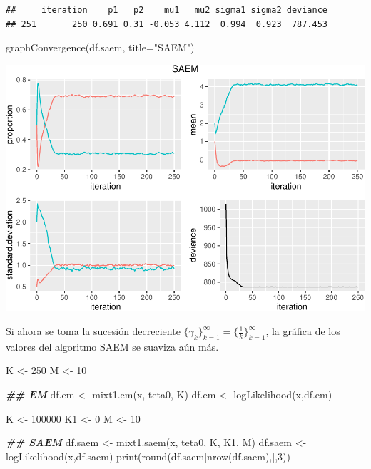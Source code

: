 \documentclass[
]{article}
\newenvironment{Shaded}{\begin{snugshade}}{\end{snugshade}}
\newcommand{\AttributeTok}[1]{\textcolor[rgb]{0.77,0.63,0.00}{#1}}
\newcommand{\DecValTok}[1]{\textcolor[rgb]{0.00,0.00,0.81}{#1}}
\newcommand{\DocumentationTok}[1]{\textcolor[rgb]{0.56,0.35,0.01}{\textbf{\textit{#1}}}}
\newcommand{\FunctionTok}[1]{\textcolor[rgb]{0.00,0.00,0.00}{#1}}
\newcommand{\NormalTok}[1]{#1}
\newcommand{\OtherTok}[1]{\textcolor[rgb]{0.56,0.35,0.01}{#1}}
\newcommand{\StringTok}[1]{\textcolor[rgb]{0.31,0.60,0.02}{#1}}
\begin{document}
\begin{verbatim}
##     iteration    p1   p2    mu1   mu2 sigma1 sigma2 deviance
## 251       250 0.691 0.31 -0.053 4.112  0.994  0.923  787.453
\end{verbatim}

\begin{Shaded}
\begin{Highlighting}[]
\FunctionTok{graphConvergence}\NormalTok{(df.saem, }\AttributeTok{title=}\StringTok{"SAEM"}\NormalTok{)}
\end{Highlighting}
\end{Shaded}

\includegraphics{Reporte0108_files/figure-latex/unnamed-chunk-12-1.pdf}

Si ahora se toma la sucesión decreciente
\(\{ \gamma_k \}_{k=1}^{\infty}=\{\frac{1}{k} \}_{k=1}^{\infty}\), la
gráfica de los valores del algoritmo SAEM se suaviza aún más.

\begin{Shaded}
\begin{Highlighting}[]
\NormalTok{K }\OtherTok{\textless{}{-}} \DecValTok{250}
\NormalTok{M }\OtherTok{\textless{}{-}} \DecValTok{10}

\DocumentationTok{\#\#  EM}
\NormalTok{df.em }\OtherTok{\textless{}{-}} \FunctionTok{mixt1.em}\NormalTok{(x, teta0, K)}
\NormalTok{df.em }\OtherTok{\textless{}{-}} \FunctionTok{logLikelihood}\NormalTok{(x,df.em)}

\NormalTok{K }\OtherTok{\textless{}{-}} \DecValTok{100000}
\NormalTok{K1 }\OtherTok{\textless{}{-}} \DecValTok{0}
\NormalTok{M }\OtherTok{\textless{}{-}} \DecValTok{10}

\DocumentationTok{\#\#  SAEM}
\NormalTok{df.saem }\OtherTok{\textless{}{-}} \FunctionTok{mixt1.saem}\NormalTok{(x, teta0, K, K1, M)}
\NormalTok{df.saem }\OtherTok{\textless{}{-}} \FunctionTok{logLikelihood}\NormalTok{(x,df.saem)}
\FunctionTok{print}\NormalTok{(}\FunctionTok{round}\NormalTok{(df.saem[}\FunctionTok{nrow}\NormalTok{(df.saem),],}\DecValTok{3}\NormalTok{))}
\end{Highlighting}
\end{Shaded}
\end{document}
